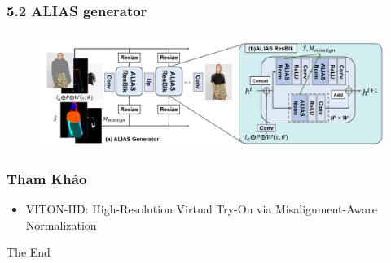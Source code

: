 \documentclass{beamer}
\begin{document}
\begin{frame}
\frametitle{5.2 ALIAS generator}

\begin{figure}
    \centering
    \includegraphics[width=1\linewidth]{alias_ge.png}
    
    
\end{figure}

\end{frame}


\begin{frame}
\frametitle{Tham Khảo}

\begin{itemize}
    \item VITON-HD: High-Resolution Virtual Try-On via Misalignment-Aware Normalization
\end{itemize}


\end{frame}

\begin{frame}
\Huge{\centerline{The End}}
\end{frame}

\end{document}
